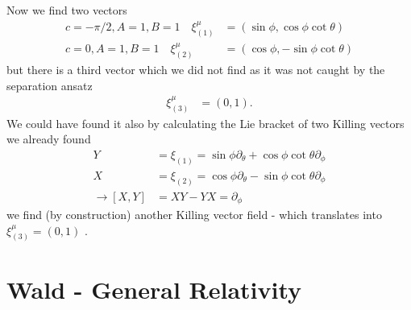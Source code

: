 \documentclass[10pt,a4paper]{book}
\theoremstyle{definition}
\begin{document}
Now we find two vectors
\begin{align}
c=-\pi/2, A=1, B=1\quad \xi^\mu_{(1)}&=(\sin\phi,\cos\phi\cot\theta)\\
c=0, A=1, B=1\quad \xi^\mu_{(2)}&=(\cos\phi,-\sin\phi\cot\theta)
\end{align}
but there is a third vector which we did not find as it was not caught by the separation ansatz
\begin{align}
\xi^\mu_{(3)}&=(0,1).
\end{align}
We could have found it also by calculating the Lie bracket of two Killing vectors we already found
\begin{align}
Y&=\xi_{(1)}=\sin\phi\partial_\theta+\cos\phi\cot\theta\partial_\phi\\
X&=\xi_{(2)}=\cos\phi\partial_\theta-\sin\phi\cot\theta\partial_\phi\\
\rightarrow[X,Y]&=XY-YX=\partial_\phi
\end{align}
we find (by construction) another Killing vector field - which translates into $\xi^\mu_{(3)}=(0,1)$ .

\section{{\sc Wald} - General Relativity}
\end{document}
